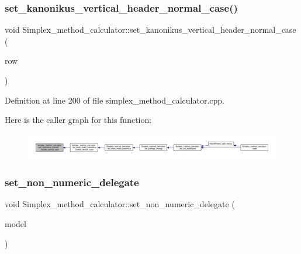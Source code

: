 \subsubsection{\texorpdfstring{set\+\_\+kanonikus\+\_\+vertical\+\_\+header\+\_\+normal\+\_\+case()}{set\_kanonikus\_vertical\_header\_normal\_case()}}
{\footnotesize\ttfamily void Simplex\+\_\+method\+\_\+calculator\+::set\+\_\+kanonikus\+\_\+vertical\+\_\+header\+\_\+normal\+\_\+case (\begin{DoxyParamCaption}\item[{int}]{row }\end{DoxyParamCaption})\hspace{0.3cm}{\ttfamily [private]}}



Definition at line 200 of file simplex\+\_\+method\+\_\+calculator.\+cpp.

Here is the caller graph for this function\+:\nopagebreak
\begin{figure}[H]
\begin{center}
\leavevmode
\includegraphics[width=350pt]{classSimplex__method__calculator_a16746b6df53ded540cfaba37be7e16dd_icgraph}
\end{center}
\end{figure}
\mbox{\label{classSimplex__method__calculator_a71ee0dcab8e7d2b4df8daeb9345abf86}} 
\subsubsection{\texorpdfstring{set\+\_\+non\+\_\+numeric\+\_\+delegate}{set\_non\_numeric\_delegate}}
{\footnotesize\ttfamily void Simplex\+\_\+method\+\_\+calculator\+::set\+\_\+non\+\_\+numeric\+\_\+delegate (\begin{DoxyParamCaption}\item[{Q\+Item\+Delegate $\ast$}]{model }\end{DoxyParamCaption})\hspace{0.3cm}{\ttfamily [signal]}}


